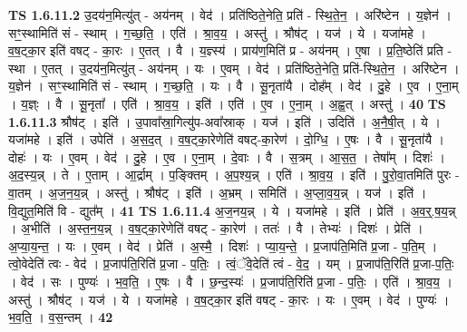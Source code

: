\documentclass[17pt]{extarticle}
\begin{document}
                  \newline
                                \textbf{ TS 1.6.11.2} \newline
                  उ॒दय॑न॒मित्यु॑त् - अय॑नम् । वेद॑ । प्रति॑ष्ठिते॒नेति॒ प्रति॑ - स्थि॒ते॒न॒ । अरि॑ष्टेन । य॒ज्ञेन॑ । सꣳ॒॒स्थामिति॑ सं - स्थाम् । ग॒च्छ॒ति॒ । एति॑ । श्रा॒व॒य॒ । अस्तु॑ । श्रौष॑ट् । यज॑ । ये । यजा॑महे । व॒ष॒ट्का॒र इति॑ वषट् - का॒रः । ए॒तत् । वै । य॒ज्ञ्स्य॑ । प्राय॑ण॒मिति॑ प्र - अय॑नम् । ए॒षा । प्र॒ति॒ष्ठेति॑ प्रति - स्था । ए॒तत् । उ॒दय॑न॒मित्यु॑त् - अय॑नम् । यः । ए॒वम् । वेद॑ । प्रति॑ष्ठिते॒नेति॒ प्रति॑-स्थि॒ते॒न॒ । अरि॑ष्टेन । य॒ज्ञेन॑ । सꣳ॒॒स्थामिति॑ सं - स्थाम् । ग॒च्छ॒ति॒ । यः । वै । सू॒नृता॑यै । दोह᳚म् । वेद॑ । दु॒हे । ए॒व । ए॒ना॒म् । य॒ज्ञ्ः । वै । सू॒नृता᳚ । एति॑ । श्रा॒व॒य॒ । इति॑ । एति॑ । ए॒व । ए॒ना॒म् । अ॒ह्व॒त् । अस्तु॑ । \textbf{  40} \newline
                  \newline
                                \textbf{ TS 1.6.11.3} \newline
                  श्रौष॑ट् । इति॑ । उ॒पावा᳚स्रा॒गित्यु॑प-अवा᳚स्राक् । यज॑ । इति॑ । उदिति॑ । अ॒नै॒षी॒त् । ये । यजा॑महे । इति॑ । उपेति॑ । अ॒स॒द॒त् । व॒ष॒ट्का॒रेणेति॑ वषट्-का॒रेण॑ । दो॒ग्धि॒ । ए॒षः । वै । सू॒नृता॑यै । दोहः॑ । यः । ए॒वम् । वेद॑ । दु॒हे । ए॒व । ए॒ना॒म् । दे॒वाः । वै । स॒त्रम् । आ॒स॒त॒ । तेषा᳚म् । दिशः॑ । अ॒द॒स्य॒न्न् । ते । ए॒ताम् । आ॒र्द्राम् । प॒ङ्क्तिम् । अ॒प॒श्य॒न्न् । एति॑ । श्रा॒व॒य॒ । इति॑ । पु॒रो॒वा॒तमिति॑ पुरः - वा॒तम् । अ॒ज॒न॒य॒न्न् । अस्तु॑ । श्रौष॑ट् । इति॑ । अ॒भ्रम् । समिति॑ । अ॒प्ला॒व॒य॒न्न् । यज॑ । इति॑ । वि॒द्युत॒मिति॑ वि - द्युत᳚म् । \textbf{  41} \newline
                  \newline
                                \textbf{ TS 1.6.11.4} \newline
                  अ॒ज॒नय॒न्न् । ये । यजा॑महे । इति॑ । प्रेति॑ । अ॒व॒र्॒.ष॒य॒न्न् । अ॒भीति॑ । अ॒स्त॒न॒य॒न्न् । व॒ष॒ट्का॒रेणेति॑ वषट् - का॒रेण॑ । ततः॑ । वै । तेभ्यः॑ । दिशः॑ । प्रेति॑ । अ॒प्या॒य॒न्त॒ । यः । ए॒वम् । वेद॑ । प्रेति॑ । अ॒स्मै॒ । दिशः॑ । प्या॒य॒न्ते॒ । प्र॒जाप॑ति॒मिति॑ प्र॒जा - प॒ति॒म् । त्वो॒वेदेति॑ त्वः - वेद॑ । प्र॒जाप॑ति॒रिति॑ प्र॒जा - प॒तिः॒ । त्वं॒ॅवे॒देति॑  त्वं - वे॒द॒ । यम् । प्र॒जाप॑ति॒रिति॑ प्र॒जा-प॒तिः॒ । वेद॑ । सः । पुण्यः॑ । भ॒व॒ति॒ । ए॒षः । वै । छ॒न्द॒स्यः॑ । प्र॒जाप॑ति॒रिति॑ प्र॒जा - प॒तिः॒ । एति॑ । श्रा॒व॒य॒ । अस्तु॑ । श्रौष॑ट् । यज॑ । ये । यजा॑महे । व॒ष॒ट्का॒र इति॑ वषट् - का॒रः । यः । ए॒वम् । वेद॑ । पुण्यः॑ । भ॒व॒ति॒ । व॒स॒न्तम् । \textbf{  42} \newline
                  \newline
\end{document}
